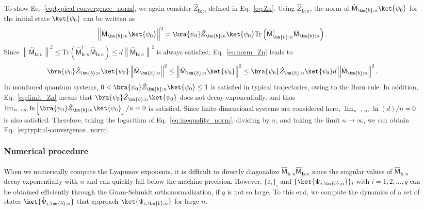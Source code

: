\documentclass[preprint,pteplogo]{ptephy_v2}%
\numberwithin{equation}{section}
\theoremstyle{definition}
\begin{document}
To show Eq.~\eqref{eq:typical-convergence_norm}, we again consider $\hat{Z}_{\bm{b};n}$ defined in Eq.~\eqref{eq:Zn}. 
Using $\hat{Z}_{\bm{b};n}$, the norm of $\hat{\mathsf{M}}_{\bm{b};n}\ket{\psi_0}$ for the initial state $\ket{\psi_0}$ can be written as
\begin{align}
    \left\|\hat{\mathsf{M}}_{\bm{b};n}\ket{\psi_0}\right\|^2
    =\bra{\psi_0}\hat{Z}_{\bm{b};n}\ket{\psi_0}
    \mathrm{Tr}\left(\hat{\mathsf{M}}_{\bm{b};n}^\dagger\hat{\mathsf{M}}_{\bm{b};n}\right).
    \label{eq:norm_Zn}
\end{align}
Since $\left\|\hat{\mathsf{M}}_{\bm{b};n}\right\|^2 \leq \mathrm{Tr}\left(\hat{\mathsf{M}}_{\bm{b};n}^\dagger\hat{\mathsf{M}}_{\bm{b};n}\right) \leq d\left\|\hat{\mathsf{M}}_{\bm{b};n}\right\|^2$ is always satisfied, Eq.~\eqref{eq:norm_Zn} leads to
\begin{align}
    \bra{\psi_0}\hat{Z}_{\bm{b};n}\ket{\psi_0}
    \left\|\hat{\mathsf{M}}_{\bm{b};n}\right\|^2
    \leq\left\|\hat{\mathsf{M}}_{\bm{b};n}\ket{\psi_0}\right\|^2
    \leq\bra{\psi_0}\hat{Z}_{\bm{b};n}\ket{\psi_0}
    d\left\|\hat{\mathsf{M}}_{\bm{b};n}\right\|^2.
    \label{eq:inequality_norm}
\end{align}
In monitored quantum systems, $0<\bra{\psi_0}\hat{Z}_{\bm{b};n}\ket{\psi_0}\leq1$ is satisfied in typical trajectories, owing to the Born rule. 
In addition, Eq.~\eqref{eq:limit_Zn} means that $\bra{\psi_0}\hat{Z}_{\bm{b};n}\ket{\psi_0}$ does not decay exponentially, and thus $\lim_{n\rightarrow\infty}\ln\left[\bra{\psi_0}\hat{Z}_{\bm{b};n}\ket{\psi_0}\right]/n=0$ is satisfied. 
Since finite-dimensional systems are considered here, $\lim_{n\rightarrow\infty}\ln(d)/n=0$ is also satisfied. 
Therefore, taking the logarithm of Eq.~\eqref{eq:inequality_norm}, dividing by $n$, and taking the limit $n\rightarrow\infty$, we can obtain Eq.~\eqref{eq:typical-convergence_norm}.


\subsubsection{Numerical procedure} \label{sec:numerical_procedure}
When we numerically compute the Lyapunov exponents, it is difficult to directly diagonalize $\hat{\mathsf{M}}_{\bm{b};n}\hat{\mathsf{M}}_{\bm{b};n}^\dagger$ since the singular values of $\hat{\mathsf{M}}_{\bm{b};n}$ decay exponentially with $n$ and can quickly fall below the machine precision. 
However, $\{\varepsilon_i\}_i$ and $\{\ket{\Psi_{i,\bm{b};n}}\}_i$ with $i=1,2,\ldots,q$ can be obtained efficiently through the Gram-Schmidt orthonormalization, if $q$ is not so large. 
To this end, we compute the dynamics of a set of states $\ket{\tilde{\Psi}_{i,\bm{b};n}}$ that approach $\ket{\Psi_{i,\bm{b};n}}$ for large $n$. 
\end{document}
